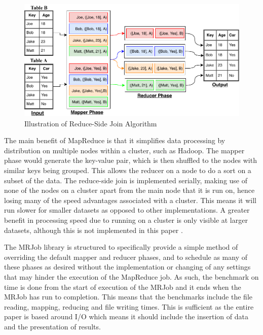 \documentclass[10.5 pt, conference]{IEEEtran}
\begin{document}
\begin{figure}[h!]
\centering
\includegraphics[width=\columnwidth]{MRDiagram.pdf}
\centering
\caption{Illustration of Reduce-Side Join Algorithm}
\label{MRJoin}
\end{figure}

The main benefit of MapReduce is that it simplifies data processing by distribution on multiple nodes within a cluster, such as Hadoop. The mapper phase would generate the key-value pair, which is then shuffled to the nodes with similar keys being grouped. This allows the reducer on a node to do a sort on a subset of the data. The reduce-side join is implemented serially, making use of none of the nodes on a cluster apart from the main node that it is run on, hence losing many of the speed advantages associated with a cluster. This means it will run slower for smaller datasets as opposed to other implementations. A greater benefit in processing speed due to running on a cluster is only visible at larger datasets, although this is not implemented in this paper \cite{Mohamed2015}.

The MRJob library is structured to specifically provide a simple method of overriding the default mapper and reducer phases, and to schedule as many of these phases as desired without the implementation or changing of any settings that may hinder the execution of the MapReduce job. As such, the benchmark on time is done from the start of execution of the MRJob and it ends when the MRJob has run to completion. This means that the benchmarks include the file reading, mapping, reducing and file writing times. This is sufficient as the entire paper is based around I/O which means it should include the insertion of data and the presentation of results.  
\end{document}
